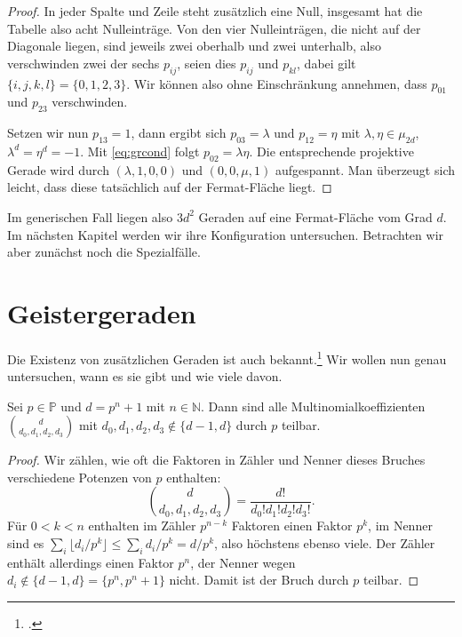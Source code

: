 \begin{proof}
In jeder Spalte und Zeile steht zusätzlich eine Null, insgesamt hat die Tabelle also acht Nulleinträge. Von den vier Nulleinträgen, die nicht auf der Diagonale liegen, sind jeweils zwei oberhalb und zwei unterhalb, also verschwinden zwei der sechs $p_{ij}$, seien dies $p_{ij}$ und $p_{kl}$, dabei gilt $\{i,j,k,l\} = \{0,1,2,3\}$. Wir können also ohne Einschränkung annehmen, dass $p_{01}$ und $p_{23}$ verschwinden.

Setzen wir nun $p_{13} = 1$, dann ergibt sich $p_{03} = \lambda$ und $p_{12} = \eta$ mit $\lambda, \eta \in \mu_{2d}$, $\lambda^d = \eta^d = -1$. Mit \eqref{eq:grcond} folgt $p_{02} = \lambda\eta$. Die entsprechende projektive Gerade wird durch $(\lambda, 1, 0, 0)$ und $(0,0,\mu,1)$ aufgespannt. Man überzeugt sich leicht, dass diese tatsächlich auf der Fermat-Fläche liegt.
\end{proof}

Im generischen Fall liegen also $3d^2$ Geraden auf eine Fermat-Fläche vom Grad $d$. Im nächsten Kapitel werden wir ihre Konfiguration untersuchen. Betrachten wir aber zunächst noch die Spezialfälle.

\section{Geistergeraden}
Die Existenz von zusätzlichen Geraden ist auch bekannt.\footcite[siehe][S.~14f]{LinesOnFermat} Wir wollen nun genau untersuchen, wann es sie gibt und wie viele davon.
\begin{prop}
Sei $p \in \mathbb P$ und $d = p^n+1$ mit $n \in \mathbb N$. Dann sind alle Multinomialkoeffizienten $\binom d{d_0,d_1,d_2,d_3}$ mit $d_0, d_1, d_2, d_3 \not\in \{d-1, d\}$ durch $p$ teilbar.
\end{prop}
\begin{proof}
Wir zählen, wie oft die Faktoren in Zähler und Nenner dieses Bruches verschiedene Potenzen von $p$ enthalten:
\begin{equation*}
\binom d{d_0,d_1,d_2,d_3} = \frac{d!}{d_0! d_1! d_2! d_3!}.
\end{equation*}
Für $0 < k < n$ enthalten im Zähler $p^{n-k}$ Faktoren einen Faktor $p^k$, im Nenner sind es $\sum_i \lfloor d_i/p^k \rfloor \leq \sum_i d_i/p^k = d/p^k$, also höchstens ebenso viele. Der Zähler enthält allerdings einen Faktor $p^n$, der Nenner wegen $d_i \not\in \{d-1, d\} = \{p^n, p^n+1\}$ nicht. Damit ist der Bruch durch $p$ teilbar.
\end{proof}

